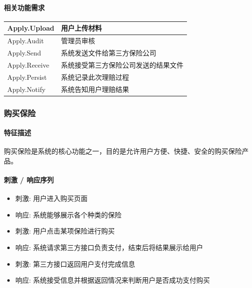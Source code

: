 \documentclass[a4paper]{ctexart}
\begin{document}
\paragraph{相关功能需求}

\begin{center}
  \begin{tabular}{p{6cm}|p{8cm}}
    \toprule
    Apply.Upload         & 用户上传材料      \\
    \midrule
    Apply.Audit & 管理员审核 \\
    \midrule
    Apply.Send            & 系统发送文件给第三方保险公司                      \\
    \midrule
    Apply.Receive            & 系统接受第三方保险公司发送的结果文件                      \\
    \midrule
    Apply.Persist            & 系统记录此次理赔过程                      \\
    \midrule
    Apply.Notify            & 系统告知用户理赔结果                    \\
    \bottomrule
  \end{tabular}
\end{center}

\subsubsection{购买保险}

\paragraph{特征描述}

购买保险是系统的核心功能之一，目的是允许用户方便、快捷、安全的购买保险产品。

\paragraph{刺激 / 响应序列}

\begin{itemize}
  \item 刺激: 用户进入购买页面
  \item 响应: 系统能够展示各个种类的保险
  \item 刺激: 用户点击某项保险进行购买
  \item 响应: 系统请求第三方接口负责支付，结束后将结果展示给用户
  \item 刺激: 第三方接口返回用户支付完成信息
  \item 响应: 系统接受信息并根据返回情况来判断用户是否成功支付购买
\end{itemize}
\end{document}
